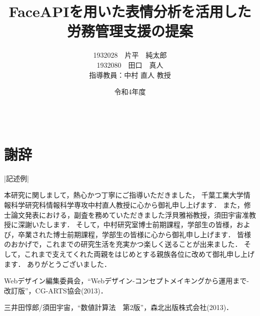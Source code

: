 \documentclass[12pt]{ltjsreport}%
\title{FaceAPIを用いた表情分析を活用した\\労務管理支援の提案}					%
\author{1932028　片平　純太郎\\1932080　田口　真人\\\normalsize 指導教員：中村 直人 教授}	%
\date{令和4年度}                                %
\begin{document}
\maketitle                          %
\tableofcontents                 %
\listoffigures				 %
\listoftables				 %

\baselineskip 20pt               %


\clearpage
{}


%










\newpage



\chapter*{　\\謝辞}
|記述例|

本研究に関しまして，熱心かつ丁寧にご指導いただきました，
千葉工業大学情報科学研究科情報科学専攻中村直人教授に心から御礼申し上げます．
また，修士論文発表における，副査を務めていただきました浮貝雅裕教授，須田宇宙准教授に深謝いたします．
そして，中村研究室博士前期課程，学部生の皆様，および，卒業された博士前期課程，学部生の皆様に心から御礼申し上げます．
皆様のおかげで，これまでの研究生活を充実かつ楽しく送ることが出来ました．
そして，これまで支えてくれた両親をはじめとする親族各位に改めて御礼申し上げます．
ありがとうございました．


\begin{thebibliography}{99}

Webデザイン編集委員会，“Webデザイン-コンセプトメイキングから運用まで-　改訂版”，CG-ARTS協会(2013)．

三井田惇郎/須田宇宙，“数値計算法　第2版”，森北出版株式会社(2013)．


\end{thebibliography}
\end{document}

